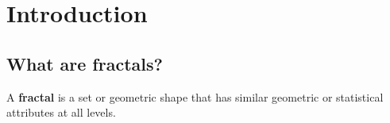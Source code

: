 \chapter*{Introduction}
\section{What are fractals?}
\begin{dfn}
  A {\bf fractal} is a set or geometric shape that has similar geometric or statistical
  attributes at all levels. 
\end{dfn}
